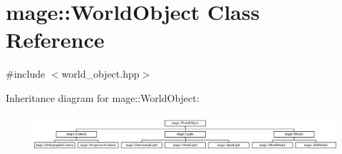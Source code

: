 \hypertarget{classmage_1_1_world_object}{}\section{mage\+:\+:World\+Object Class Reference}
\label{classmage_1_1_world_object}


{\ttfamily \#include $<$world\+\_\+object.\+hpp$>$}

Inheritance diagram for mage\+:\+:World\+Object\+:\begin{figure}[H]
\begin{center}
\leavevmode
\includegraphics[height=1.371429cm]{classmage_1_1_world_object}
\end{center}
\end{figure}
